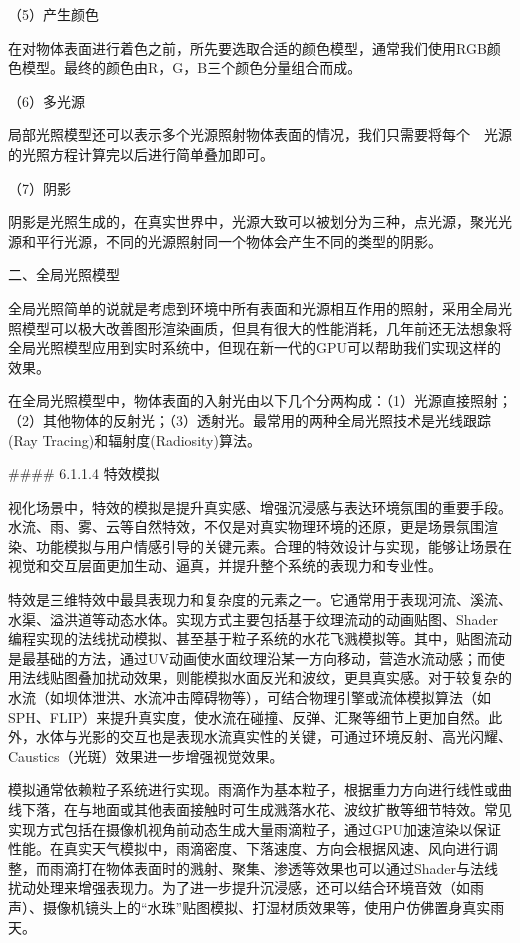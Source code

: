 （5）产生颜色

在对物体表面进行着色之前，所先要选取合适的颜色模型，通常我们使用RGB颜色模型。最终的颜色由R，G，B三个颜色分量组合而成。

（6）多光源

局部光照模型还可以表示多个光源照射物体表面的情况，我们只需要将每个　光源的光照方程计算完以后进行简单叠加即可。

（7）阴影

阴影是光照生成的，在真实世界中，光源大致可以被划分为三种，点光源，聚光光源和平行光源，不同的光源照射同一个物体会产生不同的类型的阴影。

二、全局光照模型

全局光照简单的说就是考虑到环境中所有表面和光源相互作用的照射，采用全局光照模型可以极大改善图形渲染画质，但具有很大的性能消耗，几年前还无法想象将全局光照模型应用到实时系统中，但现在新一代的GPU可以帮助我们实现这样的效果。

在全局光照模型中，物体表面的入射光由以下几个分两构成：（1）光源直接照射；（2）其他物体的反射光；（3）透射光。最常用的两种全局光照技术是光线跟踪(Ray Tracing)和辐射度(Radiosity)算法。

\#\#\#\# 6.1.1.4 特效模拟

视化场景中，特效的模拟是提升真实感、增强沉浸感与表达环境氛围的重要手段。水流、雨、雾、云等自然特效，不仅是对真实物理环境的还原，更是场景氛围渲染、功能模拟与用户情感引导的关键元素。合理的特效设计与实现，能够让场景在视觉和交互层面更加生动、逼真，并提升整个系统的表现力和专业性。

特效是三维特效中最具表现力和复杂度的元素之一。它通常用于表现河流、溪流、水渠、溢洪道等动态水体。实现方式主要包括基于纹理流动的动画贴图、Shader编程实现的法线扰动模拟、甚至基于粒子系统的水花飞溅模拟等。其中，贴图流动是最基础的方法，通过UV动画使水面纹理沿某一方向移动，营造水流动感；而使用法线贴图叠加扰动效果，则能模拟水面反光和波纹，更具真实感。对于较复杂的水流（如坝体泄洪、水流冲击障碍物等），可结合物理引擎或流体模拟算法（如SPH、FLIP）来提升真实度，使水流在碰撞、反弹、汇聚等细节上更加自然。此外，水体与光影的交互也是表现水流真实性的关键，可通过环境反射、高光闪耀、Caustics（光斑）效果进一步增强视觉效果。

模拟通常依赖粒子系统进行实现。雨滴作为基本粒子，根据重力方向进行线性或曲线下落，在与地面或其他表面接触时可生成溅落水花、波纹扩散等细节特效。常见实现方式包括在摄像机视角前动态生成大量雨滴粒子，通过GPU加速渲染以保证性能。在真实天气模拟中，雨滴密度、下落速度、方向会根据风速、风向进行调整，而雨滴打在物体表面时的溅射、聚集、渗透等效果也可以通过Shader与法线扰动处理来增强表现力。为了进一步提升沉浸感，还可以结合环境音效（如雨声）、摄像机镜头上的``水珠''贴图模拟、打湿材质效果等，使用户仿佛置身真实雨天。

